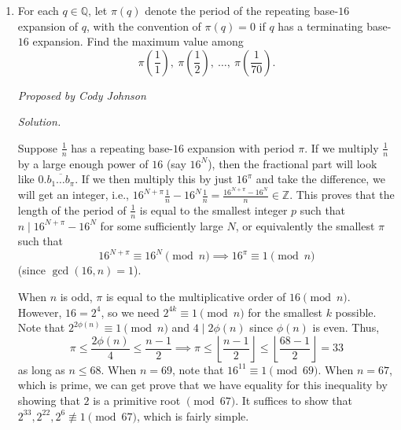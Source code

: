 \documentclass[10pt]{article}
\newcommand{\proposed}[1]
{
\vspace{5pt}
\noindent\textit{Proposed by #1}
}
\newcommand{\solution}
{
\vspace{5pt}
\noindent\textit{Solution.}\qquad
}
\begin{document}
\begin{enumerate}
\proposed{Andrew Kwon}

\solution
We claim that for $n > 1$, $\phi(n) | n \iff n = 2^a 3^b,$ where $a \geq 1$ and $b \geq 0$. Evidently $n$ must be even. Let $n = 2^a m$, where $m$ is odd. If $m$ has more than 2 prime distinct prime factors, then $\varphi(m)$ will be divisible by $4$. However, then $2^{a+1} | 2^{a-1} \varphi(m) = \varphi(n) | n$, which is a contradiction. Therefore, $m = p^b$ for some prime $p$ and nonnegative integer $b$. Then, $p-1 | \varphi(n) | n$, and so $p-1$ must be a power of 2. Upon analogous considerations as before to the largest power of 2 that can divide $\varphi(n)$, we find that $p-1$ is necessarily equal to 2, and so $p = 3$.\\

We thus must find the sum of all integers of the form $2^a 3^b < 100$, where $a \geq 1$ and $b \geq 0$, and casing on the value of $b$ we can calculate this with geometric series to be $\boxed{492}$.

\item For each $q\in\mathbb Q$, let $\pi(q)$ denote the period of the repeating base-$16$ expansion of $q$, with the convention of $\pi(q)=0$ if $q$ has a terminating base-$16$ expansion. Find the maximum value among \[\pi\left(\frac11\right),~\pi\left(\frac12\right),~\dots,~\pi\left(\frac1{70}\right).\]

\proposed{Cody Johnson}

\solution
Suppose $\frac1n$ has a repeating base-$16$ expansion with period $\pi$. If we multiply $\frac1n$ by a large enough power of $16$ (say $16^N$), then the fractional part will look like $0.\overline{b_1\dots b_\pi}$. If we then multiply this by just $16^\pi$ and take the difference, we will get an integer, i.e., $16^{N+\pi}\frac1n-16^N\frac1n=\frac{16^{N+\pi}-16^N}n\in\mathbb Z$. This proves that the length of the period of $\frac1n$ is equal to the smallest integer $p$ such that $n\mid 16^{N+\pi}-16^N$ for some sufficiently large $N$, or equivalently the smallest $\pi$ such that \[16^{N+\pi}\equiv16^N\pmod n\implies16^\pi\equiv1\pmod n\] (since $\gcd(16,n)=1$).

\par When $n$ is odd, $\pi$ is equal to the multiplicative order of $16\pmod n$. However, $16=2^4$, so we need $2^{4k}\equiv 1\pmod n$ for the smallest $k$ possible. Note that $2^{2\phi(n)}\equiv1\pmod n$ and $4\mid 2\phi(n)$ since $\phi(n)$ is even. Thus, \[\pi\le\frac{2\phi(n)}4\le\frac{n-1}2\implies \pi\le\left\lfloor\frac{n-1}2\right\rfloor\le\left\lfloor\frac{68-1}2\right\rfloor=\boxed{33}\] as long as $n\le68$. When $n=69$, note that $16^{11}\equiv1\pmod{69}$. When $n=67$, which is prime, we can get prove that we have equality for this inequality by showing that $2$ is a primitive root $\pmod{67}$. It suffices to show that $2^{33},2^{22},2^6\not\equiv1\pmod{67}$, which is fairly simple.



\end{enumerate}
\end{document}
